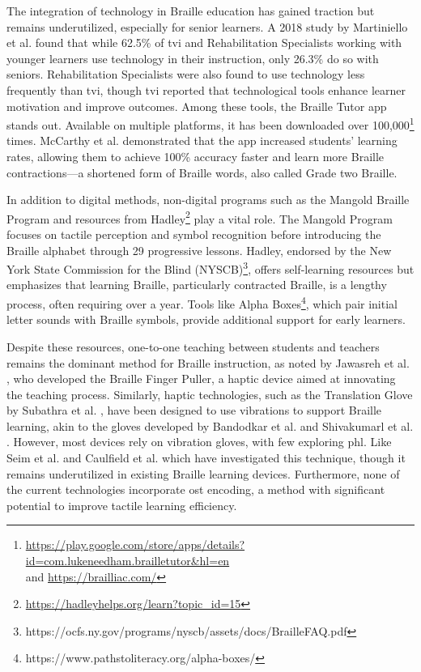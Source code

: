 The integration of technology in Braille education has gained traction but remains underutilized, especially for senior learners. A 2018 study by Martiniello et al. \cite{Martiniello2018} found that while 62.5\% of \gls{tvi} and Rehabilitation Specialists working with younger learners use technology in their instruction, only 26.3\% do so with seniors. Rehabilitation Specialists were also found to use technology less frequently than \gls{tvi}, though \gls{tvi} reported that technological tools enhance learner motivation and improve outcomes. Among these tools, the Braille Tutor app stands out. Available on multiple platforms, it has been downloaded over 100,000\footnote{\url{https://play.google.com/store/apps/details?id=com.lukeneedham.brailletutor&hl=en}\\and \url{https://brailliac.com/}} times. McCarthy et al. \cite{McCarthy2016} demonstrated that the app increased students’ learning rates, allowing them to achieve 100\% accuracy faster and learn more Braille contractions—a shortened form of Braille words, also called Grade two Braille\cite{troughton1992guidelines}.


In addition to digital methods, non-digital programs such as the Mangold Braille Program \cite{Mangoldnd} and resources from Hadley\footnote{\url{https://hadleyhelps.org/learn?topic_id=15}} play a vital role.
The Mangold Program focuses on tactile perception and symbol recognition before introducing the Braille alphabet through 29 progressive lessons. Hadley, endorsed by the New York State Commission for the Blind (NYSCB)\footnote{https://ocfs.ny.gov/programs/nyscb/assets/docs/BrailleFAQ.pdf}, offers self-learning resources but emphasizes that learning Braille, particularly contracted Braille, is a lengthy process, often requiring over a year. Tools like Alpha Boxes\footnote{https://www.pathstoliteracy.org/alpha-boxes/}, which pair initial letter sounds with Braille symbols, provide additional support for early learners.

Despite these resources, one-to-one teaching between students and teachers remains the dominant method for Braille instruction, as noted by Jawasreh et al. \cite{Jawasreh2020}, who developed the Braille Finger Puller, a haptic device aimed at innovating the teaching process. Similarly, haptic technologies, such as the Translation Glove by Subathra et al. \cite{Subathra2024}, have been designed to use vibrations to support Braille learning, akin to the gloves developed by Bandodkar et al. \cite{Bandodkar2014} and Shivakumarl et al. \cite{Shivakumarl2013}. However, most devices rely on vibration gloves, with few exploring \gls{phl}. Like Seim et al. and Caulfield et al. \cite{Learning2024} which have investigated this technique, though it remains underutilized in existing Braille learning devices. Furthermore, none of the current technologies incorporate \gls{ost} encoding, a method with significant potential to improve tactile learning efficiency.


